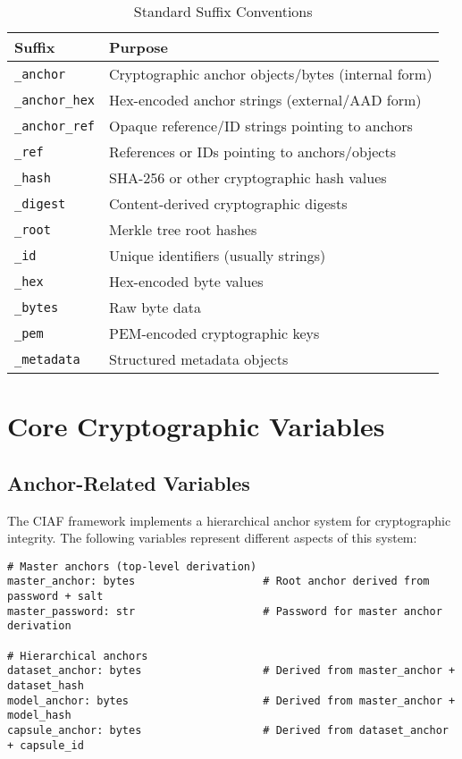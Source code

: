 \documentclass[12pt,a4paper]{article}
\begin{document}
\begin{table}[H]
\centering
\caption{Standard Suffix Conventions}
\begin{tabular}{@{}ll@{}}
\toprule
\textbf{Suffix} & \textbf{Purpose} \\
\midrule
\texttt{\_anchor} & Cryptographic anchor objects/bytes (internal form) \\
\texttt{\_anchor\_hex} & Hex-encoded anchor strings (external/AAD form) \\
\texttt{\_anchor\_ref} & Opaque reference/ID strings pointing to anchors \\
\texttt{\_ref} & References or IDs pointing to anchors/objects \\
\texttt{\_hash} & SHA-256 or other cryptographic hash values \\
\texttt{\_digest} & Content-derived cryptographic digests \\
\texttt{\_root} & Merkle tree root hashes \\
\texttt{\_id} & Unique identifiers (usually strings) \\
\texttt{\_hex} & Hex-encoded byte values \\
\texttt{\_bytes} & Raw byte data \\
\texttt{\_pem} & PEM-encoded cryptographic keys \\
\texttt{\_metadata} & Structured metadata objects \\
\bottomrule
\end{tabular}
\end{table}

\section{Core Cryptographic Variables}

\subsection{Anchor-Related Variables}

The CIAF framework implements a hierarchical anchor system for cryptographic integrity. The following variables represent different aspects of this system:

\begin{lstlisting}[caption=Master Anchors]
# Master anchors (top-level derivation)
master_anchor: bytes                    # Root anchor derived from password + salt
master_password: str                    # Password for master anchor derivation

# Hierarchical anchors
dataset_anchor: bytes                   # Derived from master_anchor + dataset_hash
model_anchor: bytes                     # Derived from master_anchor + model_hash
capsule_anchor: bytes                   # Derived from dataset_anchor + capsule_id
\end{lstlisting}
\end{document}
